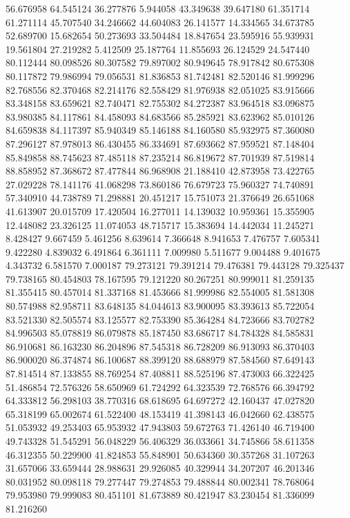 56.676958
64.545124
36.277876
5.944058
43.349638
39.647180
61.351714
61.271114
45.707540
34.246662
44.604083
26.141577
14.334565
34.673785
52.689700
15.682654
50.273693
33.504484
18.847654
23.595916
55.939931
19.561804
27.219282
5.412509
25.187764
11.855693
26.124529
24.547440
80.112444
80.098526
80.307582
79.897002
80.949645
78.917842
80.675308
80.117872
79.986994
79.056531
81.836853
81.742481
82.520146
81.999296
82.768556
82.370468
82.214176
82.558429
81.976938
82.051025
83.915666
83.348158
83.659621
82.740471
82.755302
84.272387
83.964518
83.096875
83.980385
84.117861
84.458093
84.683566
85.285921
83.623962
85.010126
84.659838
84.117397
85.940349
85.146188
84.160580
85.932975
87.360080
87.296127
87.978013
86.430455
86.334691
87.693662
87.959521
87.148404
85.849858
88.745623
87.485118
87.235214
86.819672
87.701939
87.519814
88.858952
87.368672
87.477844
86.968908
21.188410
42.873958
73.422765
27.029228
78.141176
41.068298
73.860186
76.679723
75.960327
74.740891
57.340910
44.738789
71.298881
20.451217
15.751073
21.376649
26.651068
41.613907
20.015709
17.420504
16.277011
14.139032
10.959361
15.355905
12.448082
23.326125
11.074053
48.715717
15.383694
14.442034
11.245271
8.428427
9.667459
5.461256
8.639614
7.366648
8.941653
7.476757
7.605341
9.422280
4.839032
6.491864
6.361111
7.009980
5.511677
9.004488
9.401675
4.343732
6.581570
7.000187
79.273121
79.391214
79.476381
79.443128
79.325437
79.738165
80.454803
78.167595
79.121220
80.267251
80.999011
81.259135
81.355415
80.457014
81.337168
81.453666
81.999986
82.554005
81.581308
80.574988
82.958711
83.648135
84.044613
83.900095
83.393613
85.722054
83.521330
82.505574
83.125577
82.753390
85.364284
84.723666
83.702782
84.996503
85.078819
86.079878
85.187450
83.686717
84.784328
84.585831
86.910681
86.163230
86.204896
87.545318
86.728209
86.913093
86.370403
86.900020
86.374874
86.100687
88.399120
88.688979
87.584560
87.649143
87.814514
87.133855
88.769254
87.408811
88.525196
87.473003
66.322425
51.486854
72.576326
58.650969
61.724292
64.323539
72.768576
66.394792
64.333812
56.298103
38.770316
68.618695
64.697272
42.160437
47.027820
65.318199
65.002674
61.522400
48.153419
41.398143
46.042660
62.438575
51.053932
49.253403
65.953932
47.943803
59.672763
71.426140
46.719400
49.743328
51.545291
56.048229
56.406329
36.033661
34.745866
58.611358
46.312355
50.229900
41.824853
55.848901
50.634360
30.357268
31.107263
31.657066
33.659444
28.988631
29.926085
40.329944
34.207207
46.201346
80.031952
80.098118
79.277447
79.274853
79.488844
80.002341
78.768064
79.953980
79.999083
80.451101
81.673889
80.421947
83.230454
81.336099
81.216260
